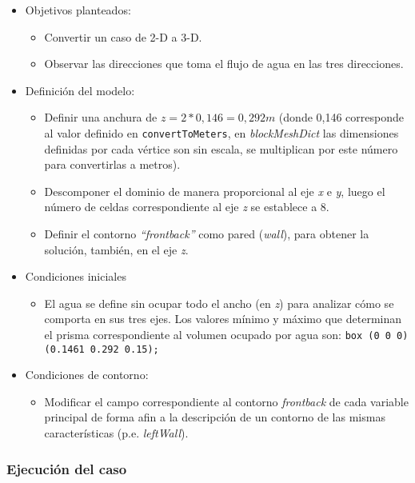 \begin{itemize}
\item
  Objetivos planteados:

  \begin{itemize}
  \item
    Convertir un caso de 2-D a 3-D.
  \item
    Observar las direcciones que toma el flujo de agua en las tres
    direcciones.
  \end{itemize}
\item
  Definición del modelo:

  \begin{itemize}
  \item
    Definir una anchura de \(z=2*0,146=0,292 m\) (donde 0,146
    corresponde al valor definido en \texttt{convertToMeters}, en
    \emph{blockMeshDict} las dimensiones definidas por cada vértice son
    sin escala, se multiplican por este número para convertirlas a
    metros).
  \item
    Descomponer el dominio de manera proporcional al eje \emph{x} e
    \emph{y}, luego el número de celdas correspondiente al eje \emph{z}
    se establece a 8.
  \item
    Definir el contorno \emph{``frontback''} como pared (\emph{wall}),
    para obtener la solución, también, en el eje \emph{z}.
  \end{itemize}
\item
  Condiciones iniciales

  \begin{itemize}
  \item
    El agua se define sin ocupar todo el ancho (en \emph{z}) para
    analizar cómo se comporta en sus tres ejes. Los valores mínimo y
    máximo que determinan el prisma correspondiente al volumen ocupado
    por agua son: \lstinline[style=bash]{box (0 0 0) (0.1461 0.292 0.15);}
  \end{itemize}
\item
  Condiciones de contorno:

  \begin{itemize}
  \item
    Modificar el campo correspondiente al contorno \emph{frontback} de
    cada variable principal de forma afin a la descripción de un
    contorno de las mismas características (p.e. \emph{leftWall}).
  \end{itemize}
\end{itemize}

\subsubsection{Ejecución del caso}\label{header-n1027}

